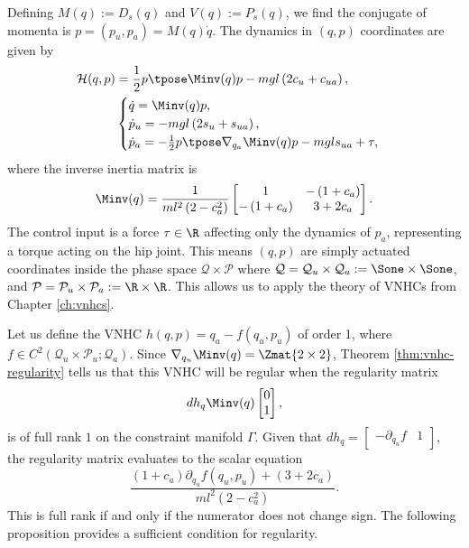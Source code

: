 Defining \(M(q) := D_s(q)\) and \(V(q) := P_s(q)\), we find the conjugate of momenta 
is \(p = (p_u, p_a) = M(q)\dot{q}\).
The dynamics in \((q,p)\) coordinates are given by
\begin{align}\label{eqn:acrobot-hamiltonian}
    \mathcal{H}(q,p) &= \frac{1}{2}p\tpose \Minv(q) p -
    mgl\left(2 c_u + c_{ua}\right)
    , \\
     &\begin{cases}
        \dot{q} = \Minv(q) p 
        ,\\
        \dot{p}_u = -mgl\left(2s_u + s_{ua}\right) 
        ,\\
        \dot{p}_a =-\frac{1}{2}p\tpose \nabla_{q_a}\Minv(q) p
        - mgl s_{ua} + \tau,
    \end{cases} \nonumber
\end{align}
where the inverse inertia matrix is
\begin{equation}\label{eqn:Minv}
    \Minv(q) = \frac{1}{ml^2\left(2-c_a^2\right)}
    \begin{bmatrix}
        1 &
        -\left(1+c_a\right) \\
        -\left(1+c_a\right) &
        3+2c_a
    \end{bmatrix}
    .
\end{equation}
The control input is a force \(\tau \in \R\) affecting only the dynamics of
\(p_a\), representing a torque acting on the hip joint.
This means \((q,p)\) are simply actuated coordinates inside the phase space
\(\mathcal{Q} \times \mathcal{P}\) where
\(\mathcal{Q} = \mathcal{Q}_u \times \mathcal{Q}_a 
:= \Sone \times \Sone\), and
\(\mathcal{P} = \mathcal{P}_u \times \mathcal{P}_a
:= \R \times \R\).
This allows us to apply the theory of VNHCs from Chapter
\ref{ch:vnhcs}.

Let us define the VNHC \(h(q,p) = q_a - f(q_u,p_u)\) of order 1, where
\(f \in C^2\left(\mathcal{Q}_u \times \mathcal{P}_u; \mathcal{Q}_a\right)\).
Since \(\nabla_{q_u}\Minv(q) = \Zmat{2\times 2}\),
Theorem \ref{thm:vnhc-regularity} tells us that this VNHC will be regular
when the regularity matrix
\[
    dh_q \Minv(q) \begin{bmatrix}0 \\ 1 \end{bmatrix}
    ,
\]
is of full rank \(1\) on the constraint manifold \(\Gamma\).
Given that
\(dh_q = \begin{bmatrix} -\partial_{q_u} f & 1 \end{bmatrix}\),
the regularity matrix evaluates to the scalar equation
\begin{equation}\label{eqn:regularity-matrix-acrobot}
    \frac{(1+c_a)\partial_{q_u}f(q_u,p_u) + (3+2c_a)}{ml^2(2-c_a^2)}
    .
\end{equation}
This is full rank if and only if the numerator does not
change sign.
The following proposition provides a sufficient condition for regularity.

